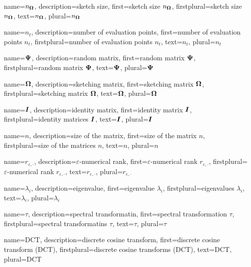 {%
  name={$n_{\boldsymbol{\Omega}}$},%
  description={sketch size},%
  first={sketch size $n_{\boldsymbol{\Omega}}$},%
  firstplural={sketch size $n_{\boldsymbol{\Omega}}$},%
  text={$n_{\boldsymbol{\Omega}}$},%
  plural={$n_{\boldsymbol{\Omega}}$}%
}

{%
  name={$n_t$},%
  description={number of evaluation points},%
  first={number of evaluation points $n_t$},%
  firstplural={number of evaluation points $n_t$},%
  text={$n_t$},%
  plural={$n_t$}%
}

{%
  name={$\boldsymbol{\Psi}$},%
  description={random matrix},%
  first={random matrix $\boldsymbol{\Psi}$},%
  firstplural={random matrix $\boldsymbol{\Psi}$},%
  text={$\boldsymbol{\Psi}$},%
  plural={$\boldsymbol{\Psi}$}%
}

{%
  name={$\boldsymbol{\Omega}$},%
  description={sketching matrix},%
  first={sketching matrix $\boldsymbol{\Omega}$},%
  firstplural={sketching matrix $\boldsymbol{\Omega}$},%
  text={$\boldsymbol{\Omega}$},%
  plural={$\boldsymbol{\Omega}$}%
}

{%
  name={$\boldsymbol{I}$},%
  description={identity matrix},%
  first={identity matrix $\boldsymbol{I}$},%
  firstplural={identity matrices $\boldsymbol{I}$},%
  text={$\boldsymbol{I}$},%
  plural={$\boldsymbol{I}$}%
}

{%
  name={$n$},%
  description={size of the matrix},%
  first={size of the matrix $n$},%
  firstplural={size of the matrices $n$},%
  text={$n$},%
  plural={$n$}%
}

{%
  name={$r_{\varepsilon, \cdot}$},%
  description={$\varepsilon$-numerical rank},%
  first={$\varepsilon$-numerical rank $r_{\varepsilon, \cdot}$},%
  firstplural={$\varepsilon$-numerical rank $r_{\varepsilon, \cdot}$},%
  text={$r_{\varepsilon, \cdot}$},%
  plural={$r_{\varepsilon, \cdot}$}%
}

{%
  name={$\lambda_i$},%
  description={eigenvalue},%
  first={eigenvalue $\lambda_i$},%
  firstplural={eigenvalues $\lambda_i$},%
  text={$\lambda_i$},%
  plural={$\lambda_i$}%
}

{%
  name={$\tau$},%
  description={spectral transformatin},%
  first={spectral transformation $\tau$},%
  firstplural={spectral transformatins $\tau$},%
  text={$\tau$},%
  plural={$\tau$}%
}

{%
  name={DCT},%
  description={discrete cosine transform},%
  first={discrete cosine transform (DCT)},%
  firstplural={discrete cosine transforms (DCT)},%
  text={DCT},%
  plural={DCT}%
}

